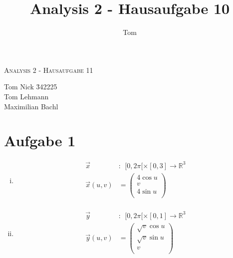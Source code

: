 \documentclass[10pt,a4paper,parskip=half]{scrartcl}
\author{Tom}
\title{Analysis 2 - Hausaufgabe 10}
\newcommand{\vecthree}[3]{\begin{pmatrix}#1\\#2\\#3\\\end {pmatrix}}
\begin{document}
\begin{center}
\textsc{\Large{Analysis 2 - Hausaufgabe 11}} \\
\end{center}
\begin{tabbing}
Tom Nick \hspace{1.4cm}\= 342225\\
Tom Lehmann\\
Maximilian Bachl
\end{tabbing}
\section*{Aufgabe 1}
\begin{enumerate}[(i)]
\item
\begin{align*}
\vec x&:~~ [0,2\pi[ \times [0,3] \to \mathbb{R}^3\\
\vec x(u,v) &= \vecthree{4\cos u}{v}{4\sin u} \\
\end{align*}
\item
\begin{align*}
\vec y&:~~ [0,2\pi[ \times [0,1] \to \mathbb{R}^3\\
\vec y(u,v) &= \vecthree{\sqrt v\cos u}{\sqrt v\sin u}{v} \\
\end{align*}
\end{enumerate}
\end{document}
